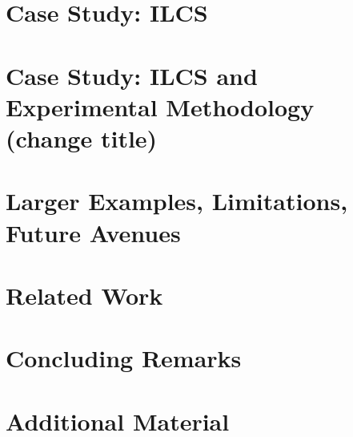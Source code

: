 \documentclass[conference]{IEEEtran}
\begin{document}
\clearpage

%

%

\section{Case Study: ILCS}
\label{sec:ilcs-case-study}


\clearpage

\section{Case Study: ILCS and Experimental Methodology (change title)}
\label{sec:experimental}



\section{Larger Examples, Limitations, Future Avenues}
\label{sec:lulesh}




\section{Related Work}
\label{sec:related}


\clearpage

\section{Concluding Remarks}
\label{sec:discussion}


\clearpage

    



\clearpage

\appendix
\section{Additional Material}
%
\end{document}
